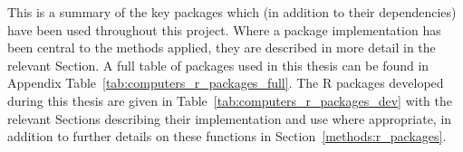 This is a summary of the key packages which (in addition to their dependencies) have been used throughout this project. Where a package implementation has been central to the methods applied, they are described in more detail in the relevant Section. A full table of packages used in this thesis can be found in Appendix Table~\ref{tab:computers_r_packages_full}. The R packages developed during this thesis are given in Table~\ref{tab:computers_r_packages_dev} with the relevant Sections describing their implementation and use where appropriate, in addition to further details on these functions in Section~\ref{methods:r_packages}. 

\begin{table}[!ht]
\centering
\caption{R installations used during thesis}
\label{tab:computers_r}
\end{table}


